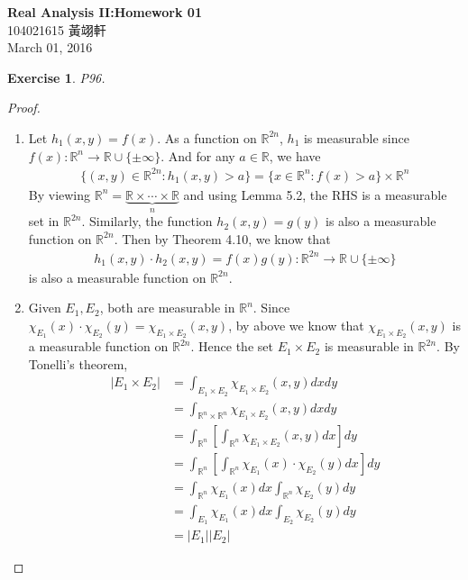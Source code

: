 \documentclass[11pt,a4paper]{article}
\renewcommand{\(}{\left(}
\renewcommand{\)}{\right)}
\renewcommand{\title}{Real Analysis II:\quad Homework 01}
\renewcommand{\author}{104021615 黃翊軒}
\renewcommand{\maketitle}{\begin{center}\textbf{\Large\title}\\[6pt] {\author}\\[6pt] {\color{Gray}\footnotesize March 01, 2016}\end{center}}
\newtheorem{exercise}{Exercise}
\begin{document}
  \maketitle

  \setcounter{exercise}{1}
  
  \begin{exercise}
  	P96.
  \end{exercise}
  
  \begin{proof}
	\begin{enumerate}
		\item Let $h_1(x,y) = f(x)$. As a function on $\mathbb{R}^{2n}$, $h_1$ is measurable since $f(x):\mathbb{R}^n \rightarrow \mathbb{R} \cup \{\pm \infty \}$.
		And for any $a \in \mathbb{R}$, we have
		\begin{align*}
		\{(x,y)\in \mathbb{R}^{2n}:h_1(x,y)>a \} = \{x\in \mathbb{R}^n:f(x)>a \}\times \mathbb{R}^n
		\end{align*}
		By viewing $\mathbb{R}^{n} = \underbrace{\mathbb{R}\times \cdots \times \mathbb{R}}_n$ and using Lemma 5.2, the RHS is a measurable set in $\mathbb{R}^{2n}$.
		Similarly, the function $h_2(x,y) = g(y)$ is also a measurable function on $\mathbb{R}^{2n}$. Then by Theorem 4.10, we know that
		\begin{align*}
		h_1(x,y)\cdot h_2(x,y) = f(x)g(y) : \mathbb{R}^{2n} \to \mathbb{R}\cup\{\pm \infty\}
		\end{align*}
		is also a measurable function on $\mathbb{R}^{2n}$.
		
		\item Given $E_1, E_2$, both are measurable in $\mathbb{R}^n$. Since $\chi_{E_1}(x)\cdot \chi_{E_2}(y) = \chi_{E_1\times E_2}(x,y)$, by above we know that $\chi_{E_1\times E_2}(x,y)$ is a measurable function on $\mathbb{R}^{2n}$. Hence the set $E_1\times E_2$ is measurable in $\mathbb{R}^{2n}$. By Tonelli's theorem, 
		\begin{align*}
		|E_1\times E_2| &= \int_{E_1 \times E_2}\chi_{E_1\times E_2}(x,y)dxdy \\
		&= \int_{\mathbb{R}^{n}\times \mathbb{R}^{n}}\chi_{E_1\times E_2}(x,y)dxdy \\
		&= \int_{\mathbb{R}^n}\left[ \int_{\mathbb{R}^n}\chi_{E_1\times E_2}(x,y)dx\right]dy \\
		&= \int_{\mathbb{R}^n}\left[\int_{\mathbb{R}^n}\chi_{E_1}(x)\cdot \chi_{E_2}(y)dx\right]dy \\
		&=	\int_{\mathbb{R}^n}\chi_{E_1}(x)dx  \int_{\mathbb{R}^n}\chi_{E_2}(y)dy \\
		&= \int_{E_1}\chi_{E_1}(x)dx  \int_{E_2}\chi_{E_2}(y)dy \\
		&= |E_1||E_2|
		\end{align*}
	\end{enumerate}
  \end{proof}
\end{document}
